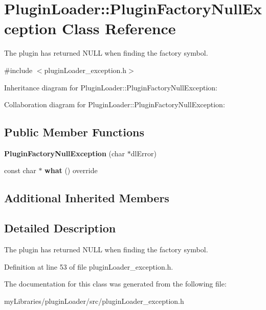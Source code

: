 \hypertarget{classPluginLoader_1_1PluginFactoryNullException}{}\section{Plugin\+Loader\+::Plugin\+Factory\+Null\+Exception Class Reference}
\label{classPluginLoader_1_1PluginFactoryNullException}


The plugin has returned N\+U\+LL when finding the factory symbol.  




{\ttfamily \#include $<$plugin\+Loader\+\_\+exception.\+h$>$}



Inheritance diagram for Plugin\+Loader\+::Plugin\+Factory\+Null\+Exception\+:


Collaboration diagram for Plugin\+Loader\+::Plugin\+Factory\+Null\+Exception\+:
\subsection*{Public Member Functions}
\begin{DoxyCompactItemize}
\item 
\mbox{\label{classPluginLoader_1_1PluginFactoryNullException_ad236634d55a54a8233b7f3a00835f0c4}} 
{\bfseries Plugin\+Factory\+Null\+Exception} (char $\ast$dl\+Error)
\item 
\mbox{\label{classPluginLoader_1_1PluginFactoryNullException_a5757ed625fe1c4fb9c18bbff2ef4141b}} 
const char $\ast$ {\bfseries what} () override
\end{DoxyCompactItemize}
\subsection*{Additional Inherited Members}


\subsection{Detailed Description}
The plugin has returned N\+U\+LL when finding the factory symbol. 

Definition at line 53 of file plugin\+Loader\+\_\+exception.\+h.



The documentation for this class was generated from the following file\+:\begin{DoxyCompactItemize}
\item 
my\+Libraries/plugin\+Loader/src/plugin\+Loader\+\_\+exception.\+h\end{DoxyCompactItemize}
